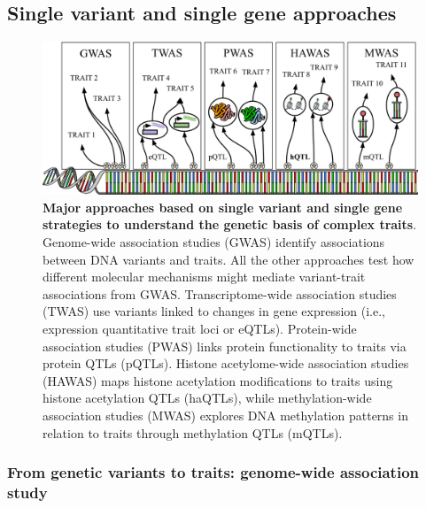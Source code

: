 \hypertarget{single-variant-and-single-gene-approaches}{%
\subsection{Single variant and single gene approaches}\label{single-variant-and-single-gene-approaches}}

\begin{figure}
\hypertarget{fig:fig1}{%
\centering
\includegraphics[width=1\textwidth,height=\textheight]{images/fig1.svg}
\caption{\textbf{Major approaches based on single variant and single gene strategies to understand the genetic basis of complex traits}.
Genome-wide association studies (GWAS) identify associations between DNA variants and traits.
All the other approaches test how different molecular mechanisms might mediate variant-trait associations from GWAS.
Transcriptome-wide association studies (TWAS) use variants linked to changes in gene expression (i.e., expression quantitative trait loci or eQTLs).
Protein-wide association studies (PWAS) links protein functionality to traits via protein QTLs (pQTLs).
Histone acetylome-wide association studies (HAWAS) maps histone acetylation modifications to traits using histone acetylation QTLs (haQTLs), while methylation-wide association studies (MWAS) explores DNA methylation patterns in relation to traits through methylation QTLs (mQTLs).}\label{fig:fig1}
}
\end{figure}

\hypertarget{from-genetic-variants-to-traits-genome-wide-association-study}{%
\subsubsection{From genetic variants to traits: genome-wide association study}\label{from-genetic-variants-to-traits-genome-wide-association-study}}

